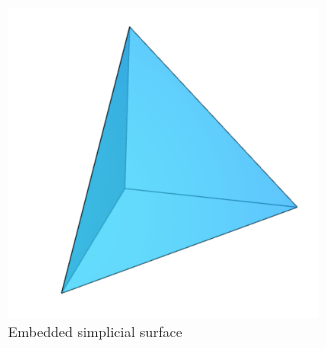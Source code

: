 \documentclass{beamer}
\numberwithin{equation}{aufgabe}
\begin{document}
\begin{frame}
\begin{example}
\begin{figure}[H]
\begin{subfigure}[t]{0.3\textwidth}
                \includegraphics[width=0.9\textwidth]{images/tet.png}
                Embedded simplicial surface
            \end{subfigure}
        \end{figure}
        \vspace{-5px}
    \end{example}
\end{frame}
\end{document}
